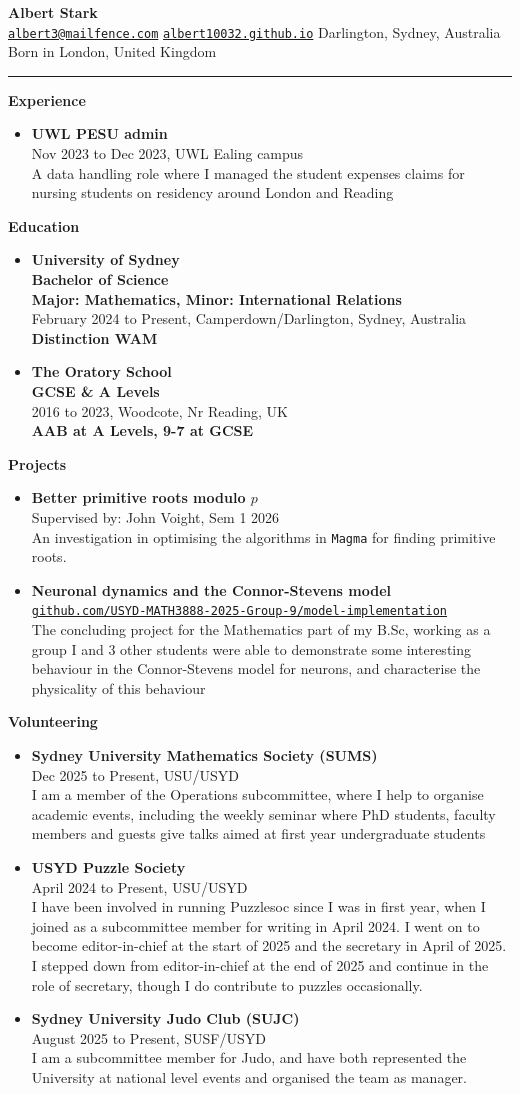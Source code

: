 \documentclass{article}
\makeatletter
\newcommand\cvtitle{
	\raggedright
	\Huge{\textbf{Albert Stark}}\\
	\vspace{0.5em}
		\large{\texttt{\href{mailto:albert3@mailfence.com}{albert3@mailfence.com}}}
		\hfill
		\large{\texttt{\href{https://albert10032.github.io/index.html}{albert10032.github.io}}}
		\hfill
		Darlington, Sydney, Australia\\
		\hfill
		Born in London, United Kingdom
	\rule{\textwidth}{2pt}
}
\newcommand\cvsec[2]{
	\LARGE{\textbf{#1}}\hspace{2.5pt}\hrulefill\\
	\large{#2}
}
\newcommand\cvexp[5]{
	\raggedright
	\Large{\textbf{#1}}\\
	\vspace{0.1em}
	\large{#2 to #3, #4}\\
	\large{#5}
}
\newcommand\cvedu[6]{
	\raggedright
	\Large{\textbf{#1}}\\
	\normalsize{\textbf{#2}}\\
	\large{
		#3 to #4,  #5\\
		\normalsize{\textbf{#6}}
	}
}
\newcommand\cvproj[4]{
	\Large{\textbf{#1}}\\
	\large{
		\texttt{\href{#2}{#3}}\\
		#4
	}
}
\newcommand\cvprojac[4]{
	\Large{\textbf{#1}}\\
	\large{
		Supervised by: #2, #3\\
		#4
	}
}
\let\svthefootnote\thefootnote
\newcommand\latestupdate{%
	\let\thefootnote\relax%
	\footnotetext{\normalsize{\textit{Updated} : \today}}%
	\let\thefootnote\svthefootnote%
}
\makeatother
\begin{document}
	\latestupdate
	\cvtitle
	
	\cvsec{Experience}{
		\begin{itemize}
			\item \cvexp{UWL PESU admin}{Nov 2023}{Dec 2023}{UWL Ealing campus}{A data handling role where I managed the student expenses claims for nursing students on residency around London and Reading}
		\end{itemize}
	}\cvsec{Education}{
		\begin{itemize}
			\item \cvedu{University of Sydney}{Bachelor of Science\\ Major: Mathematics, Minor: International Relations}{February 2024}{Present}{Camperdown/Darlington, Sydney, Australia}{Distinction WAM}
			\item \cvedu{The Oratory School}{GCSE \& A Levels}{2016}{2023}{Woodcote, Nr Reading, UK}{AAB at A Levels, 9-7 at GCSE}
		\end{itemize}
	}\cvsec{Projects}{
		\begin{itemize}
			\item \cvprojac{Better primitive roots modulo $p$}{John Voight}{Sem 1 2026}{An investigation in optimising the algorithms in \texttt{Magma} for finding primitive roots.}
			\item \cvproj{Neuronal dynamics and the Connor-Stevens model}{https://github.com/USYD-MATH3888-2025-Group-9/model-implementation}{github.com/USYD-MATH3888-2025-Group-9/model-implementation}{The concluding project for the Mathematics part of my B.Sc, working as a group I and 3 other students were able to demonstrate some interesting behaviour in the Connor-Stevens model for neurons, and characterise the physicality of this behaviour}
		\end{itemize}
	}
	\cvsec{Volunteering}{
		\begin{itemize}
			\item \cvexp{Sydney University Mathematics Society (SUMS)}{Dec 2025}{Present}{USU/USYD}{
				I am a member of the Operations subcommittee, where I help to organise academic events, including the weekly seminar where PhD students, faculty members and guests give talks aimed at first year undergraduate students
			}
			\newpage
			\item \cvexp{USYD Puzzle Society}{April 2024}{Present}{USU/USYD}{
				I have been involved in running Puzzlesoc since I was in first year, when I joined as a subcommittee member for writing in April 2024. I went on to become editor-in-chief at the start of 2025 and the secretary in April of 2025. I stepped down from editor-in-chief at the end of 2025 and continue in the role of secretary, though I do contribute to puzzles occasionally.
			}
			\item \cvexp{Sydney University Judo Club (SUJC)}{August 2025}{Present}{SUSF/USYD}{
				I am a subcommittee member for Judo, and have both represented the University at national level events and organised the team as manager.
			}
		\end{itemize}
	}
	
\end{document}
